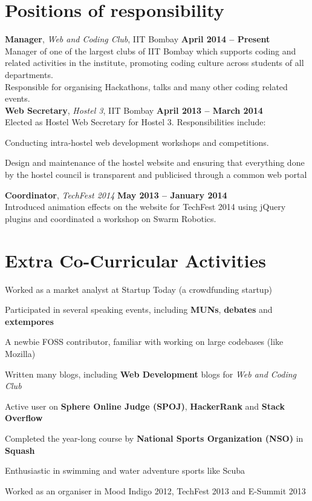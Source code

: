 \documentclass[margin,11pt]{resume}
\begin{document}
\begin{resume}
\section{\mysidestyle Positions of responsibility}
\textbf{Manager}, \textsl{Web and Coding Club}, IIT Bombay \hfill \textbf{April 2014 -- Present}\\
Manager of one of the largest clubs of IIT Bombay which supports coding and related activities in the institute, promoting coding culture across students of all departments. \\ Responsible for organising Hackathons, talks and many other coding related events.
\vspace{2mm}\\
\textbf{Web Secretary}, \textsl{Hostel 3}, IIT Bombay \hfill \textbf{April 2013 -- March 2014}\\
Elected as Hostel Web Secretary for Hostel 3. Responsibilities include:
\begin{list2}
\item Conducting intra-hostel web development workshops and competitions.
\item Design and maintenance of the hostel website and ensuring that everything done by the hostel council is transparent and publicised through a common web portal
\end{list2}
\vspace{-3mm}
\textbf{Coordinator}, \textsl{TechFest 2014} \hfill \textbf{May 2013 -- January 2014}\\
Introduced animation effects on the website for TechFest 2014 using jQuery plugins and
coordinated a workshop on Swarm Robotics.


\section{\mysidestyle Extra Co-Curricular Activities}
\begin{list2}
\item Worked as a market analyst at Startup Today (a crowdfunding startup)
\item Participated in several speaking events, including \textbf{MUNs}, \textbf{debates} and \textbf{extempores}
\item A newbie FOSS contributor, familiar with working on large codebases (like Mozilla)
\item Written many blogs, including \textbf{Web Development} blogs for \textsl{Web and Coding Club}
\item Active user on \textbf{Sphere Online Judge (SPOJ)}, \textbf{HackerRank} and \textbf{Stack Overflow}
\item Completed the year-long course by \textbf{National Sports Organization (NSO)} in \textbf{Squash}
\item Enthusiastic in swimming and water adventure sports like Scuba
\item Worked as an organiser in Mood Indigo 2012, TechFest 2013 and E-Summit 2013
\end{list2}




\end{resume}
\end{document}
